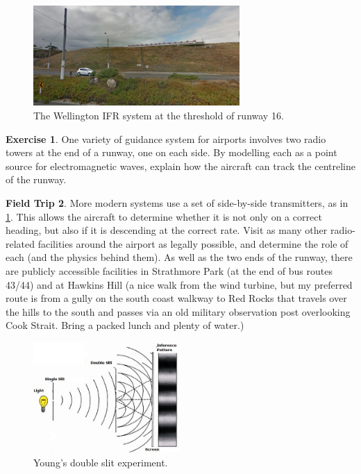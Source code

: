 \documentclass[a4paper]{amsbook}
\theoremstyle{definition}
\newtheorem{exercise}{Exercise}
\numberwithin{exercise}{chapter}
\numberwithin{exercise}{chapter}
\newtheorem{trip}[exercise]{Field Trip}
\begin{document}
\begin{figure}
  \centering
  \includegraphics[width=0.7\textwidth]{localiser}
  \caption{The Wellington IFR system at the threshold of runway 16.}\label{fig:localiser}
\end{figure}
\begin{exercise}
  One variety of guidance system for airports involves two radio towers at the end of a runway, one on each side. By modelling
  each as a point source for electromagnetic waves, explain how the aircraft can track the centreline of the runway.
\end{exercise}

\begin{trip}
  More modern systems use a set of side-by-side transmitters, as in \cref{fig:localiser}. This allows the aircraft to determine whether
  it is not only on a correct heading, but also if it is descending at the correct rate. Visit as many other radio-related facilities around
  the airport as legally possible, and determine the role of each (and the physics behind them). As well as the two ends of the runway, there
  are publicly accessible facilities in Strathmore Park (at the end of bus routes 43/44) and at Hawkins Hill (a nice walk from the wind turbine,
  but my preferred route is from a gully on the south coast walkway to Red Rocks that travels over the hills to the south and passes via an old
  military observation post overlooking Cook Strait. Bring a packed lunch and plenty of water.)
\end{trip}

\begin{figure}
  \centering
  \includegraphics[width=0.5\textwidth]{doubleslit}
  \caption{Young's double slit experiment.}\label{fig:young}
\end{figure}
\end{document}
